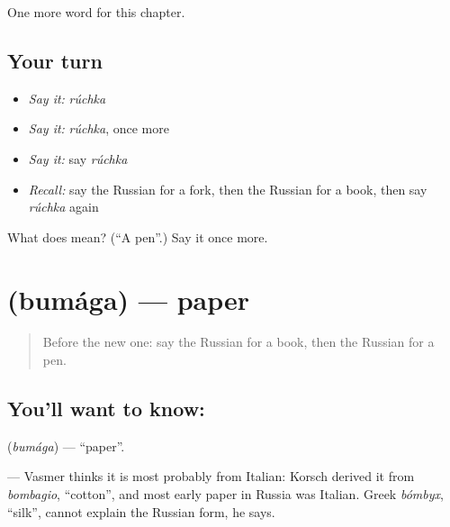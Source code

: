 \begin{grammarlens}[title={What you've built}]
One more word for this chapter.
\end{grammarlens}

\subsection*{Your turn}
\begin{itemize}
\raggedright
  \item \emph{Say it:} \emph{rúchka}
  \item \emph{Say it:} \emph{rúchka}, once more
  \item \emph{Say it:} say \emph{rúchka}
  \item \emph{Recall:} say the Russian for a fork, then the Russian for a book, then say \emph{rúchka} again
\end{itemize}

\begin{tcolorbox}[breakable,colback=teal!4,colframe=teal!35!black,title={Before you move on}]
What does  mean? (\textquotedblleft{}A pen\textquotedblright{}.) Say it once more.
\end{tcolorbox}
\section[\texorpdfstring{\ru{бумага} (bumága)}{бумага (bumága)}]{ (bumága) — paper}

\label{lesson:RU-C52-paper}



\begin{quote}
Before the new one: say the Russian for a book, then the Russian for a pen.
\end{quote}

\subsection*{You'll want to know: }
\textbf{} (\emph{bumága}) — \textquotedblleft{}paper\textquotedblright{}.

\begin{cousinweb}
\textbf{} — Vasmer thinks it is most probably from Italian: Korsch derived it from \emph{bombagio}, \textquotedblleft{}cotton\textquotedblright{}, and most early paper in Russia was Italian. Greek \emph{bómbyx}, \textquotedblleft{}silk\textquotedblright{}, cannot explain the Russian form, he says.
\end{cousinweb}

